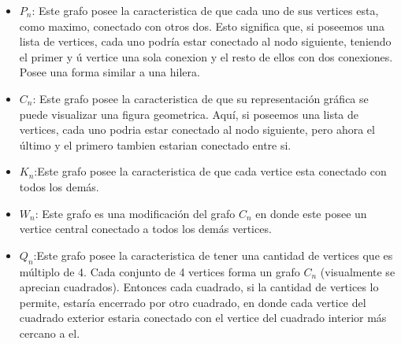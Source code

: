 \documentclass[spanish, fleqn]{article}
\begin{document}
\begin{enumerate}
\begin{itemize}
\item $P_{n}$: Este grafo posee la caracteristica de que cada uno de sus vertices esta, como maximo, conectado con otros dos. Esto significa que, si poseemos una lista de vertices, cada uno podría estar conectado al nodo siguiente, teniendo el primer y ú vertice una sola conexion y el resto de ellos con dos conexiones. Posee una forma similar a una hilera.
\item $C_{n}$: Este grafo posee la caracteristica de que su representación gráfica se puede visualizar una figura geometrica. Aquí, si poseemos una lista de vertices, cada uno podria estar conectado al nodo siguiente, pero ahora el último y el primero tambien estarian conectado entre si. 
\item $K_{n}$:Este grafo posee la caracteristica de que cada vertice esta conectado con todos los demás.
\item $W_{n}$: Este grafo es una modificación del grafo $C_{n}$ en donde este posee un vertice central conectado a todos los demás vertices. 
\item $Q_{n}$:Este grafo posee la caracteristica de tener una cantidad de vertices que es múltiplo de 4. Cada conjunto de 4 vertices forma un grafo $C_{n}$ (visualmente se aprecian cuadrados). Entonces cada cuadrado, si la cantidad de vertices lo permite, estaría encerrado por otro cuadrado, en donde cada vertice del cuadrado exterior estaria conectado con el vertice del cuadrado interior más cercano a el.
\end{itemize}  
\end{enumerate}
\end{document}
